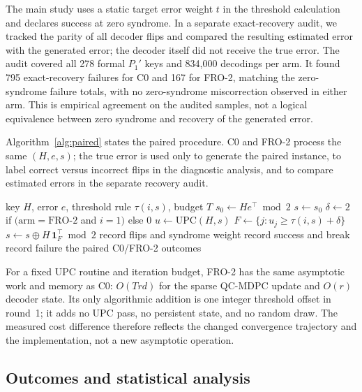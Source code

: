 \documentclass[lettersize,journal]{IEEEtran}
\begin{document}
The main study uses a static target error weight $t$ in the threshold calculation and declares success at zero syndrome. In a separate exact-recovery audit, we tracked the parity of all decoder flips and compared the resulting estimated error with the generated error; the decoder itself did not receive the true error. The audit covered all 278 formal $P_1'$ keys and 834{,}000 decodings per arm. It found 795 exact-recovery failures for C0 and 167 for FRO-2, matching the zero-syndrome failure totals, with no zero-syndrome miscorrection observed in either arm. This is empirical agreement on the audited samples, not a logical equivalence between zero syndrome and recovery of the generated error.

Algorithm~\ref{alg:paired} states the paired procedure. C0 and FRO-2 process the same $(H,e,s)$; the true error is used only to generate the paired instance, to label correct versus incorrect flips in the diagnostic analysis, and to compare estimated errors in the separate recovery audit.

\begin{algorithm}[t]
\caption{Paired C0/FRO-2 decoding and evaluation}
\label{alg:paired}
\footnotesize
\begin{algorithmic}[1]
\Require key $H$, error $e$, threshold rule $\tau(i,s)$, budget $T$
\State $s_0 \gets H e^{\top} \bmod 2$ 
  \State $s\gets s_0$
    \State $\delta \gets 2$ if $(\mathrm{arm}=\mathrm{FRO\text{-}2}$ and $i=1)$ else $0$
    \State $u \gets \mathrm{UPC}(H,s)$
    \State $F \gets \{j: u_j \ge \tau(i,s)+\delta\}$
    \State $s \gets s \oplus H\,\mathbf{1}_F^{\top} \bmod 2$
    \State record flips and syndrome weight
     record success and break \EndIf
  \EndFor
   record failure \EndIf
\EndFor
\State \Return the paired C0/FRO-2 outcomes
\end{algorithmic}
\end{algorithm}

For a fixed UPC routine and iteration budget, FRO-2 has the same asymptotic work and memory as C0: $O(Trd)$ for the sparse QC-MDPC update and $O(r)$ decoder state. Its only algorithmic addition is one integer threshold offset in round~1; it adds no UPC pass, no persistent state, and no random draw. The measured cost difference therefore reflects the changed convergence trajectory and the implementation, not a new asymptotic operation.

\subsection{Outcomes and statistical analysis}
\end{document}
